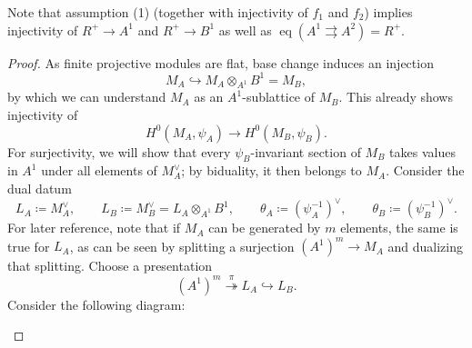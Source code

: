 \documentclass[10pt,twoside]{article}
\numberwithin{equation}{section}
\theoremstyle{plain}
\theoremstyle{definition}
\DeclareMathOperator{\eq}{eq}
\begin{document}
Note that assumption (1) (together with injectivity of \(f_1\) and \(f_2\)) implies injectivity of \(R^+\to A^1\) and \(R^+\to B^1\) as well as \(\eq(A^1\rightrightarrows A^2) =R^+\).

\begin{proof}
    As finite projective modules are flat, base change induces an injection 
    \[M_A\hookrightarrow M_A\otimes_{A^1}B^1=M_B,\] 
    by which we can understand \(M_A\) as an \(A^1\)-sublattice of \(M_B\). This already shows injectivity of
    \[H^0(M_A,\psi_A)\longrightarrow H^0(M_B,\psi_B).\]
    For surjectivity, we will show that every \(\psi_B\)-invariant section of \(M_B\) takes values in \(A^1\) under all elements of \(M_A^\vee\); by biduality, it then belongs to \(M_A\). Consider the dual datum
    \[L_A\coloneqq M_A^\vee,\qquad L_B\coloneqq M_B^\vee=L_A\otimes_{A^1}B^1,
    \qquad \theta_A\coloneqq(\psi_A^{-1})^\vee,\qquad \theta_B\coloneqq(\psi_B^{-1})^\vee.\]
For later reference, note that if \(M_A\) can be generated by \(m\) elements, the same is true for \(L_A\), as can be seen by splitting a surjection \((A^1)^m\to M_A\) and dualizing that splitting. Choose a presentation
    \begin{equation*}\tag{*}\label{caseIPresentation}
        (A^1)^m \overset{\pi}{\twoheadrightarrow} L_A\hookrightarrow L_B.
    \end{equation*}
    Consider the following diagram:
    \begin{center}
    \end{center}


\end{proof}
\end{document}
